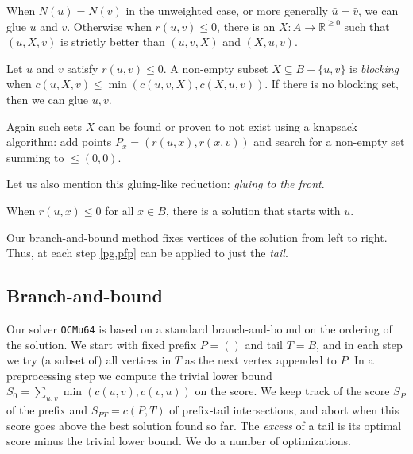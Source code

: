 \documentclass[a4paper,UKenglish,cleveref, autoref, thm-restate]{lipics-v2021}
\begin{document}
\begin{remark}
  When $N(u)=N(v)$ in the unweighted case, or more generally $\bar u=\bar v$, we can glue $u$
    and $v$.
  Otherwise when $r(u,v)\leq 0$, there is an $X : A\to \mathbb R^{\geq 0}$ such that $(u, X, v)$ is
  strictly better than $(u,v,X)$ and $(X,u,v)$.
\end{remark}
\begin{lemma}\label{pg}
    Let $u$ and $v$ satisfy $r(u, v) \leq 0$.
    A non-empty subset $X\subseteq B-\{u,v\}$ is \emph{blocking} when $c(u, X, v) \leq
    \min(c(u, v, X), c(X, u, v))$. If there is no blocking set, then we can glue $u, v$.
\end{lemma}
Again such sets $X$ can be found or proven to not exist using a knapsack
algorithm: add points $P_x = (r(u, x), r(x, v))$ and search for a non-empty
set summing to $\leq{}(0,0)$.

Let us also mention this gluing-like reduction: \emph{gluing to the front}.
\begin{lemma}[Greedy]\label{greedy}
  When $r(u, x)\leq 0$ for all $x\in B$, there is a solution that
  starts with $u$.
\end{lemma}

\begin{remark}
  Our branch-and-bound method fixes vertices of the
solution from left to right. Thus, at each step \cref{pg,pfp} can be applied to
just the \emph{tail}.
\end{remark}


\subsection{Branch-and-bound}
Our solver \texttt{OCMu64} is based on a standard branch-and-bound on the ordering of the
solution.  We start with fixed prefix $P=()$ and tail $T=B$, and in each step we try (a
subset of) all vertices in $T$ as the next vertex appended to $P$.
In a preprocessing step we compute the trivial lower bound $S_0 =
\sum_{u,v}\min(c(u,v),c(v,u))$ on the score.
We keep track of the score $S_P$ of the prefix and $S_{PT}=c(P, T)$ of
prefix-tail intersections, and abort when this score goes above the best
solution found so far. The \emph{excess} of a tail is its optimal score minus
the trivial lower bound. We do a number of optimizations.
\end{document}
